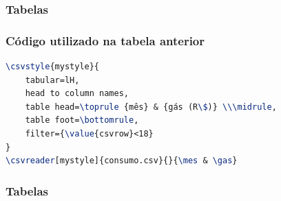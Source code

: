 \begin{frame}
\frametitle{Tabelas}
\centering
\scriptsize
\begin{table}[h]
\caption{\label{tab-example03}Valor gasto mensalmente com gás.}
\end{table}
\end{frame}

\begin{frame}[fragile]
\frametitle{Código utilizado na tabela anterior}
\begin{lstlisting}[language=tex, label=lst-tabela, caption={Tabela gerada a partir de um arquivo CSV. Pacotes utilizados: csvsimple e booktabs.}, postbreak=\mbox{$\hookrightarrow$\space}, basicstyle=\fontsize{8}{10}\selectfont\ttfamily]
\csvstyle{mystyle}{
    tabular=lH,
    head to column names,
    table head=\toprule {mês} & {gás (R\$)} \\\midrule,
    table foot=\bottomrule,
    filter={\value{csvrow}<18}
}
\csvreader[mystyle]{consumo.csv}{}{\mes & \gas}
\end{lstlisting}
\end{frame}


\begin{frame}
\frametitle{Tabelas}
\centering
\scriptsize
\begin{table}[h]
\caption{\label{tab-example03}Valor gasto mensalmente com gás.}
\end{table}
\end{frame}




